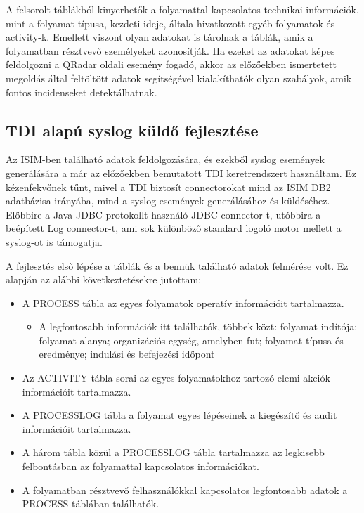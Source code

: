 A felsorolt táblákból kinyerhetők a folyamattal kapcsolatos technikai információk, mint a folyamat típusa, kezdeti ideje, általa hivatkozott egyéb folyamatok és activity-k. Emellett viszont olyan adatokat is tárolnak a táblák, amik a folyamatban résztvevő személyeket azonosítják. Ha ezeket az adatokat képes feldolgozni a QRadar oldali esemény fogadó, akkor az előzőekben ismertetett megoldás által feltöltött adatok segítségével kialakíthatók olyan szabályok, amik fontos incidenseket detektálhatnak.
 
\subsection{TDI alapú syslog küldő fejlesztése}
Az ISIM-ben található adatok feldolgozására, és ezekből syslog események generálására a már az előzőekben bemutatott TDI keretrendszert használtam. Ez kézenfekvőnek tűnt, mivel a TDI biztosít connectorokat mind az ISIM DB2 adatbázisa irányába, mind a syslog események generálásához és küldéséhez. Előbbire a Java JDBC protokollt használó JDBC connector-t, utóbbira a beépített Log connector-t, ami sok különböző standard logoló motor mellett a syslog-ot is támogatja. 

A fejlesztés első lépése a táblák és a bennük található adatok felmérése volt. Ez alapján az alábbi következtetésekre jutottam:

\begin{itemize}
	\item A PROCESS tábla az egyes folyamatok operatív információit tartalmazza. 
	
	\begin{itemize}
		\item A legfontosabb információk itt találhatók, többek közt: folyamat indítója; folyamat alanya; organizációs egység, amelyben fut; folyamat típusa és eredménye; indulási és befejezési időpont
	\end{itemize}
	
	\item Az ACTIVITY tábla sorai az egyes folyamatokhoz tartozó elemi akciók információit tartalmazza.
	
	\item A PROCESSLOG tábla a folyamat egyes lépéseinek a kiegészítő és audit információit tartalmazza.
	
	\item A három tábla közül a PROCESSLOG tábla tartalmazza az legkisebb felbontásban az folyamattal kapcsolatos információkat.
	
	\item A folyamatban résztvevő felhasználókkal kapcsolatos legfontosabb adatok a PROCESS táblában találhatók.
\end{itemize}

